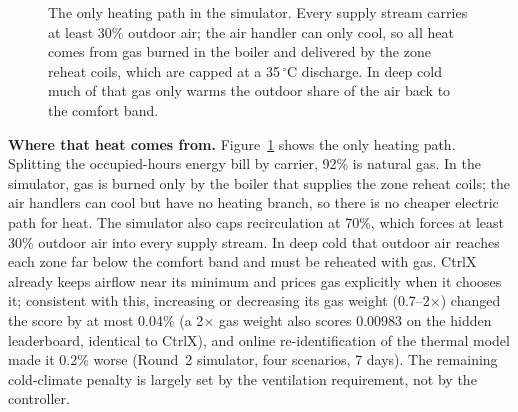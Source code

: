 \documentclass{article}
\begin{document}
\begin{figure}[t]
\centering
{}
\caption{The only heating path in the simulator. Every supply stream carries at least 30\% outdoor air; the air handler can only cool, so all heat comes from gas burned in the boiler and delivered by the zone reheat coils, which are capped at a 35\,$^\circ$C discharge. In deep cold much of that gas only warms the outdoor share of the air back to the comfort band.}\label{fig:path}
\end{figure}

\textbf{Where that heat comes from.} Figure~\ref{fig:path} shows the only heating path. Splitting the occupied-hours energy bill by carrier, 92\% is natural gas. In the simulator, gas is burned only by the boiler that supplies the zone reheat coils; the air handlers can cool but have no heating branch, so there is no cheaper electric path for heat. The simulator also caps recirculation at 70\%, which forces at least 30\% outdoor air into every supply stream. In deep cold that outdoor air reaches each zone far below the comfort band and must be reheated with gas. CtrlX already keeps airflow near its minimum and prices gas explicitly when it chooses it; consistent with this, increasing or decreasing its gas weight (0.7--2$\times$) changed the score by at most 0.04\% (a 2$\times$ gas weight also scores 0.00983 on the hidden leaderboard, identical to CtrlX), and online re-identification of the thermal model made it 0.2\% worse (Round~2 simulator, four scenarios, 7 days). The remaining cold-climate penalty is largely set by the ventilation requirement, not by the controller.
\end{document}

